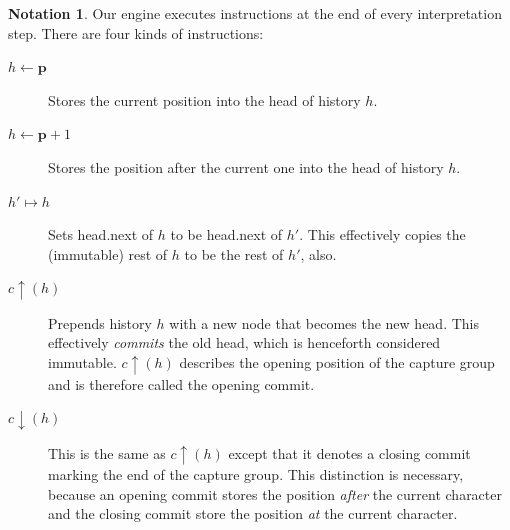 \documentclass[11pt]{Thesis}
\theoremstyle{definition}
\newtheorem*{notation}{Notation}
\newcommand{\pos}{\mathbf{\mathbf{p}}}
\begin{document}
\begin{notation}
Our engine executes instructions at the end of every interpretation
step. There are four kinds of instructions:

\begin{description}
\item [$h\leftarrow\pos$] Stores the current position into the head of history $h$.
\item [$h\leftarrow\pos+1$] Stores the position after the current one into the
  head of history $h$.
\item [$h'\mapsto h$] Sets head.next of $h$ to be head.next of $h'$. 
	This effectively copies the (immutable) rest of $h$ to be the rest of $h'$, also. 
\item [$c\uparrow(h)$] Prepends history $h$ with a new node that becomes the
  new head.  This effectively \emph{commits} the old head, which is henceforth
  considered immutable. $c\uparrow(h)$ describes the opening position of the
  capture group and is therefore called the opening commit. 
\item [$c\downarrow(h)$] This is the same as $c\uparrow(h)$ except that it
  denotes a closing commit marking the end of the capture group.  This
  distinction is necessary, because an opening commit stores the position
  \emph{after} the current character and the closing commit store the
  position \emph{at} the current character.
\end{description}
\end{notation}
\end{document}
